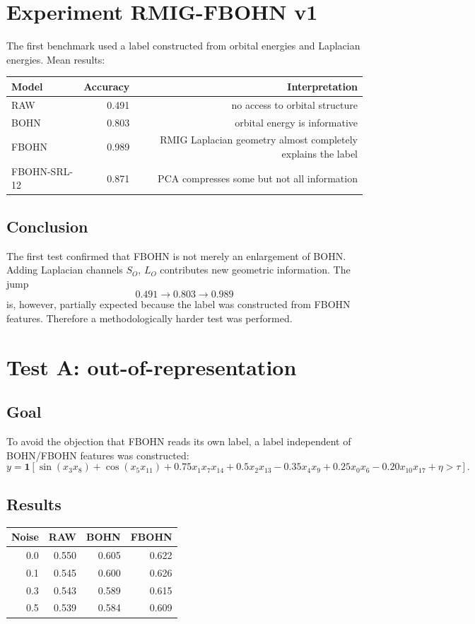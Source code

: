\documentclass[11pt,a4paper]{report}
\begin{document}
\section{Experiment RMIG-FBOHN v1}
\label{sec:rmig_fbohn_v1}

The first benchmark used a label constructed from orbital energies and Laplacian energies. Mean results:
\begin{center}
\begin{tabular}{lrr}
\toprule
Model & Accuracy & Interpretation\\
\midrule
RAW & 0.491 & no access to orbital structure\\
BOHN & 0.803 & orbital energy is informative\\
FBOHN & 0.989 & RMIG Laplacian geometry almost completely explains the label\\
FBOHN-SRL-12 & 0.871 & PCA compresses some but not all information\\
\bottomrule
\end{tabular}
\end{center}

\subsection{Conclusion}

The first test confirmed that FBOHN is not merely an enlargement of BOHN. Adding Laplacian channels $S_O$, $L_O$ contributes new geometric information. The jump
\[
0.491\to 0.803\to 0.989
\]
is, however, partially expected because the label was constructed from FBOHN features. Therefore a methodologically harder test was performed.

\section{Test A: out-of-representation}
\label{sec:test_a_oor}

\subsection{Goal}
To avoid the objection that FBOHN reads its own label, a label independent of BOHN/FBOHN features was constructed:
\[
y=\mathbf{1}\!\left[
\sin(x_3x_8)+\cos(x_5x_{11})+0.75x_1x_7x_{14}+0.5x_2x_{13}
-0.35x_4x_9+0.25x_0x_6-0.20x_{10}x_{17}+\eta>\tau
\right].
\]

\subsection{Results}
\begin{center}
\begin{tabular}{rrrr}
\toprule
Noise & RAW & BOHN & FBOHN\\
\midrule
0.0 & 0.550 & 0.605 & 0.622\\
0.1 & 0.545 & 0.600 & 0.626\\
0.3 & 0.543 & 0.589 & 0.615\\
0.5 & 0.539 & 0.584 & 0.609\\
\bottomrule
\end{tabular}
\end{center}
\end{document}
